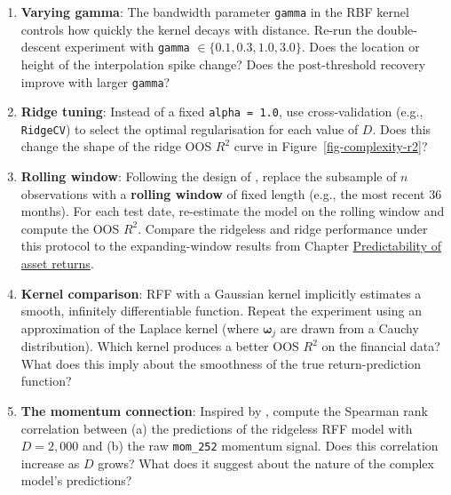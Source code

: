 \begin{enumerate}
\item \textbf{Varying gamma}: The bandwidth parameter \texttt{gamma} in the RBF kernel controls how quickly the kernel decays with distance. Re-run the double-descent experiment with \texttt{gamma} $\in \{0.1, 0.3, 1.0, 3.0\}$. Does the location or height of the interpolation spike change? Does the post-threshold recovery improve with larger \texttt{gamma}?
\item \textbf{Ridge tuning}: Instead of a fixed \texttt{alpha = 1.0}, use cross-validation (e.g., \texttt{RidgeCV}) to select the optimal regularisation for each value of $D$. Does this change the shape of the ridge OOS $R^2$ curve in Figure~\ref{fig-complexity-r2}?
\item \textbf{Rolling window}: Following the design of \cite{kelly2024virtue}, replace the subsample of $n$ observations with a \textbf{rolling window} of fixed length (e.g., the most recent 36 months). For each test date, re-estimate the model on the rolling window and compute the OOS $R^2$. Compare the ridgeless and ridge performance under this protocol to the expanding-window results from Chapter \href{/chap-04-predictability}{Predictability of asset returns}.
\item \textbf{Kernel comparison}: RFF with a Gaussian kernel implicitly estimates a smooth, infinitely differentiable function. Repeat the experiment using an approximation of the Laplace kernel (where $\boldsymbol{\omega}_j$ are drawn from a Cauchy distribution). Which kernel produces a better OOS $R^2$ on the financial data? What does this imply about the smoothness of the true return-prediction function?
\item \textbf{The momentum connection}: Inspired by \cite{nagel2025seemingly}, compute the Spearman rank correlation between (a) the predictions of the ridgeless RFF model with $D = 2{,}000$ and (b) the raw \texttt{mom\_252} momentum signal. Does this correlation increase as $D$ grows? What does it suggest about the nature of the complex model's predictions?
\end{enumerate}